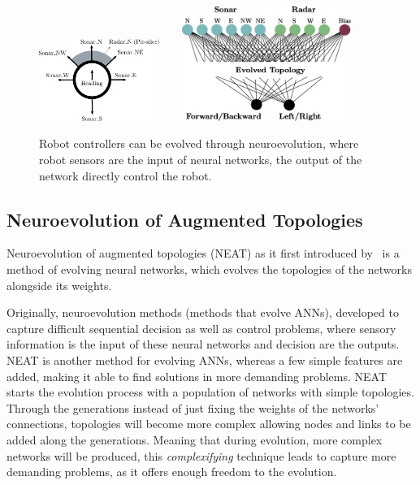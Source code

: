 \begin{figure}[t!]
\centering
\includegraphics[width=0.35\textwidth]{../Figures/Misc/RobotMaze.eps}\  \    \  \    
\includegraphics[width=0.49\textwidth]{../Figures/Misc/RobotMazeNetwork.eps}
\caption{Robot controllers can be evolved through neuroevolution, where robot sensors are the input of neural networks, the output of the network directly control the robot.}
\label{fig:robotExample}
\end{figure}


\subsection{Neuroevolution of Augmented Topologies}

Neuroevolution of augmented topologies (NEAT) as it first introduced by~\cite{stanley2002evolving} is a method of evolving neural networks, which evolves the topologies of the networks alongside its weights.

Originally, neuroevolution methods (methods that evolve ANNs), developed to capture difficult sequential decision as well as control problems, where sensory information is the input of these neural networks and decision are the outputs. NEAT is another method for evolving ANNs, whereas a few simple features are added, making it able to find solutions in more demanding problems. NEAT starts the evolution process with a population of networks with simple topologies. Through the generations instead of just fixing the weights of the networks' connections, topologies will become more complex allowing nodes and links to be added along the generations. Meaning that during evolution, more complex networks will be produced, this \emph{complexifying} technique leads to capture more demanding problems, as it offers enough freedom to the evolution.

